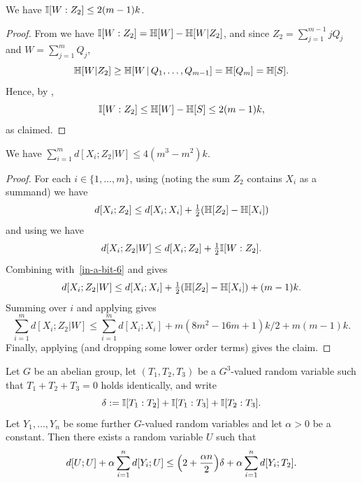 \begin{lemma}\label{mutual-w-z2}\leanok  We have  $\mathbb{I}[W : Z_2] \leq 2 (m-1) k$.
\end{lemma}

\begin{proof}\leanok
  From  we have $\mathbb{I}[W : Z_2] = \mathbb{H}[W] - \mathbb{H}[W | Z_2]$, and since $Z_2 = \sum_{j=1}^{m-1} j Q_j$ and $W = \sum_{j=1}^m Q_j$,
  \[
    \mathbb{H}[W | Z_2] \geq \mathbb{H}[W \,|\, Q_1,\dots,Q_{m-1}] = \mathbb{H}[Q_m] = \mathbb{H}[S].
  \]
  Hence, by ,
  \[
    \mathbb{I}[W : Z_2] \leq \mathbb{H}[W] - \mathbb{H}[S] \leq 2 (m-1) k,
  \]
  as claimed.
\end{proof}

\begin{lemma}\label{xi-z2-w-dist}\leanok We have $\sum_{i=1}^m d[X_i;Z_2|W] \leq 4(m^3-m^2) k$.
\end{lemma}

\begin{proof}\leanok
  For each $i \in \{1,\dots, m\}$, using  (noting the sum $Z_2$ contains $X_i$ as a summand) we have
  \begin{equation}\label{in-a-bit-6}
    d[X_i;Z_2] \leq d[X_i;X_i] + \tfrac12 (\mathbb{H}[Z_2] - \mathbb{H}[X_i])
  \end{equation}
  and using  we have
  \[
    d[X_i;Z_2 | W] \leq d[X_i;Z_2] + \tfrac12 \mathbb{I}[W : Z_2].
  \]
 Combining with~\eqref{in-a-bit-6} and  gives
 \[ d[X_i;Z_2 | W] \leq d[X_i;X_i] + \tfrac12 (\mathbb{H}[Z_2] - \mathbb{H}[X_i]) + (m-1)k.\]
 Summing over $i$ and applying  gives
 \[ \sum_{i = 1}^m d[X_i;Z_2 | W] \leq \sum_{i = 1}^m d[X_i;X_i] + m(8m^2-16m+1) k/2 + m(m-1) k.\]
Finally, applying  (and dropping some lower order terms) gives the claim.
\end{proof}

\begin{lemma}
  \label{lem:get-better}\leanok
  Let $G$ be an abelian group, let $(T_1,T_2,T_3)$ be a $G^3$-valued random variable such that $T_1+T_2+T_3=0$ holds identically, and write
  \[
    \delta := \mathbb{I}[T_1 : T_2] + \mathbb{I}[T_1 : T_3] + \mathbb{I}[T_2 : T_3].
  \]
  Let $Y_1,\dots,Y_n$ be some further $G$-valued random variables and let $\alpha>0$ be a constant.
  Then there exists a random variable $U$ such that
  \begin{equation}
    \label{eq:get-better}
    d[U;U] + \alpha \sum_{i=1}^n d[Y_i;U] \leq \Bigl(2 + \frac{\alpha n}{2} \Bigr) \delta + \alpha \sum_{i=1}^n d[Y_i;T_2].
  \end{equation}
\end{lemma}

